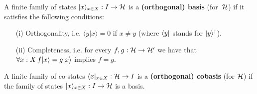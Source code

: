 \begin{defn}\label{def:basis}
A finite family of states $| x \rangle_{x\in X}: I \rightarrow \mathcal{H}$ is a \textbf{(orthogonal) basis} (for~$\mathcal{H}$) if it satisfies the following conditions:
\begin{enumerate}
\item[(i)] Orthogonality, i.e. $\langle y|x\rangle = 0$ if $x \neq y$ (where $\langle y |$ stands for $| y \rangle^\dagger$).
\item[(ii)] Completeness, i.e. for every $f,g : \mathcal{H} \rightarrow \mathcal{H}'$ we have that $\forall x:X \, f | x \rangle = g | x \rangle$ implies $f=g$. 
\end{enumerate}
A finite family of co-states $\langle x |_{x\in X}: \mathcal{H} \rightarrow I$ is a \textbf{(orthogonal) cobasis} (for $\mathcal{H}$) if the family of states $| x \rangle_{x\in X}: I \rightarrow \mathcal{H}$ is a basis.
\end{defn}
